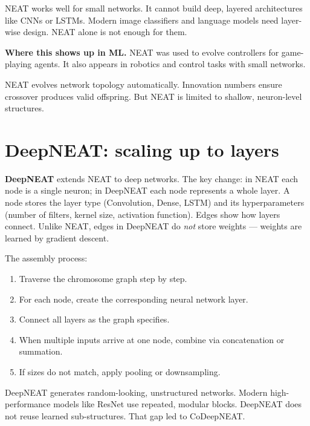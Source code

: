 \documentclass[a4paper,11pt]{article}
\newcommand{\vocab}[1]{\textbf{\color{navy}#1}}
\begin{document}
\begin{watchout}
NEAT works well for small networks.
It cannot build deep, layered architectures like CNNs or LSTMs.
Modern image classifiers and language models need layer-wise design.
NEAT alone is not enough for them.
\end{watchout}

\textbf{Where this shows up in ML.}
NEAT was used to evolve controllers for game-playing agents.
It also appears in robotics and control tasks with small networks.

\begin{keytake}
NEAT evolves network topology automatically.
Innovation numbers ensure crossover produces valid offspring.
But NEAT is limited to shallow, neuron-level structures.
\end{keytake}

\section{DeepNEAT: scaling up to layers}

\vocab{DeepNEAT} extends NEAT to deep networks.
The key change: in NEAT each node is a single neuron; in DeepNEAT each
node represents a whole layer.
A node stores the layer type (Convolution, Dense, LSTM) and its
hyperparameters (number of filters, kernel size, activation function).
Edges show how layers connect.
Unlike NEAT, edges in DeepNEAT do \emph{not} store weights --- weights
are learned by gradient descent.

The assembly process:
\begin{enumerate}
  \item Traverse the chromosome graph step by step.
  \item For each node, create the corresponding neural network layer.
  \item Connect all layers as the graph specifies.
  \item When multiple inputs arrive at one node, combine via concatenation
        or summation.
  \item If sizes do not match, apply pooling or downsampling.
\end{enumerate}

\begin{watchout}
DeepNEAT generates random-looking, unstructured networks.
Modern high-performance models like ResNet use repeated, modular blocks.
DeepNEAT does not reuse learned sub-structures.
That gap led to CoDeepNEAT.
\end{watchout}
\end{document}
